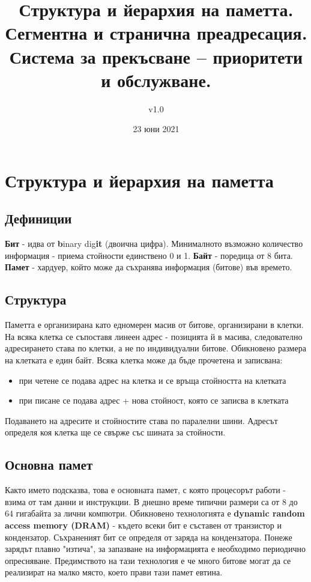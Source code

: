 \documentclass[fleqn,12pt]{article}
\title{Структура и йерархия на паметта. Сегментна и странична преадресация.
Система за прекъсване – приоритети и обслужване.}
\author{v1.0}
\date{23 юни 2021}
\begin{document}
\maketitle

\tableofcontents

\section{Структура и йерархия на паметта}

\subsection{Дефиниции}
\textbf{Бит} - идва от \textbf{b}inary dig\textbf{it} (двоична цифра). Минималното възможно количество информация - приема стойности единствено 0 и 1.
\textbf{Байт} - поредица от 8 бита.
\textbf{Памет} - хардуер, който може да съхранява информация (битове) във времето.

\subsection{Структура}
Паметта е организирана като едномерен масив от битове, организирани в клетки. На всяка клетка се съпоставя линеен адрес - позицията й в масива, 
следователно адресирането става по клетки, а не по индивидуални битове. Обикновено размера на клетката е един байт.
Всяка клетка може да бъде прочетена и записвана:
\begin{itemize}
    \item при четене се подава адрес на клетка и се връща стойността на клетката
    \item при писане се подава адрес + нова стойност, която се записва в клетката
\end{itemize}

Подаването на адресите и стойностите става по паралелни шини. Адресът определя коя клетка ще се свърже със шината за стойности.

\subsection{Основна памет}
Както името подсказва, това е основната памет, с която процесорът работи - взима от там данни и инструкции. 
В днешно време типични размери са от 8 до 64 гигабайта за лични компютри.
Обикновено технологията е \textbf{dynamic random access memory (DRAM)} - където всеки бит е съставен от транзистор и кондензатор.
Съхраненият бит се определя от заряда на кондензатора. Понеже зарядът плавно "изтича", за запазване на информацията е необходимо
периодично опресняване. Предимството на тази технология е че много битове могат да се реализират на малко място, което прави тази памет евтина.
\end{document}
